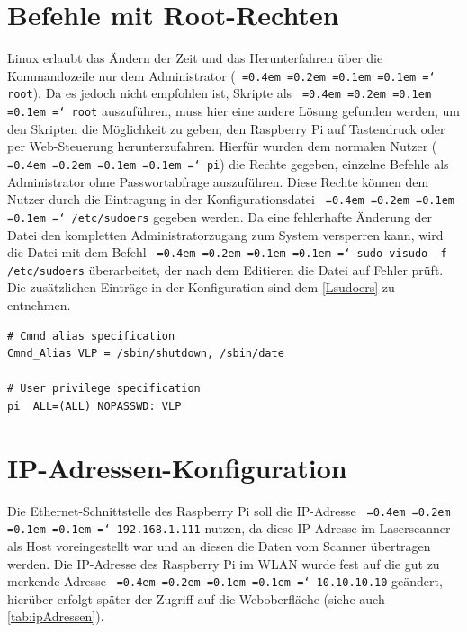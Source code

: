 \documentclass[a4paper,12pt,bibliography=totoc, listof=totoc,titlepage,pointlessnumbers]{scrreprt}
\newcommand*\justify{%
  \fontdimen2\font=0.4em%
  \fontdimen3\font=0.2em%
  \fontdimen4\font=0.1em%
  \fontdimen7\font=0.1em%
  \hyphenchar\font=`\-%
}
\newcommand{\code}[1]{\texttt{\justify{#1}}}
\begin{document}
\section{Befehle mit Root-Rechten}
\label{s:root}
Linux erlaubt das Ändern der Zeit und das Herunterfahren über die Kommandozeile nur dem Administrator (\code{root}). Da es jedoch nicht empfohlen ist, Skripte als \code{root} auszuführen, muss hier eine andere Lösung gefunden werden, um den Skripten die Möglichkeit zu geben, den Rasp\-berry Pi auf Tastendruck oder per Web-Steuerung herunterzufahren. Hierfür wurden dem normalen Nutzer (\code{pi}) die Rechte gegeben, einzelne Befehle  als Administrator ohne Passwortabfrage auszuführen. Diese Rechte können dem Nutzer durch die Eintragung in der Konfigurationsdatei \code{/etc/sudoers} gegeben werden. Da eine fehlerhafte Änderung der Datei den kompletten Administratorzugang zum System versperren kann, wird die Datei mit dem Befehl \code{sudo visudo -f /etc/sudoers} überarbeitet, der nach dem Editieren die Datei auf Fehler prüft. Die zusätzlichen Einträge in der Konfiguration sind dem \autoref{Lsudoers} zu entnehmen. \citep[S. 33]{Frisch2003}

\begin{lstlisting}[caption={Ergänzung der \code{/etc/sudoers}}, label={Lsudoers}]
# Cmnd alias specification
Cmnd_Alias VLP = /sbin/shutdown, /sbin/date

# User privilege specification
pi	ALL=(ALL) NOPASSWD: VLP
\end{lstlisting}

\section{IP-Adressen-Konfiguration}
Die Ethernet-Schnittstelle des Rasp\-berry Pi soll die IP-Adresse \code{192.168.1.111} nutzen, da diese IP-Adresse im Laser\-scan\-ner als Host voreingestellt war und an diesen die Daten vom Scanner übertragen werden. Die IP-Adresse des Rasp\-berry Pi im WLAN wurde fest auf die gut zu merkende Adresse \code{10.10.10.10} geändert, hierüber erfolgt später der Zugriff auf die Weboberfläche (siehe auch \autoref{tab:ipAdressen}).
\end{document}
